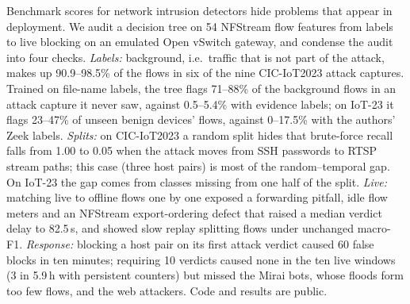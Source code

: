 Benchmark scores for network intrusion detectors hide problems that appear in deployment. We audit a decision tree on 54 NFStream flow features from labels to live blocking on an emulated Open vSwitch gateway, and condense the audit into four checks. \emph{Labels:} background, i.e.\ traffic that is not part of the attack, makes up 90.9--98.5\% of the flows in six of the nine CIC-IoT2023 attack captures. Trained on file-name labels, the tree flags 71--88\% of the background flows in an attack capture it never saw, against 0.5--5.4\% with evidence labels; on IoT-23 it flags 23--47\% of unseen benign devices' flows, against 0--17.5\% with the authors' Zeek labels. \emph{Splits:} on CIC-IoT2023 a random split hides that brute-force recall falls from 1.00 to 0.05 when the attack moves from SSH passwords to RTSP stream paths; this case (three host pairs) is most of the random--temporal gap. On IoT-23 the gap comes from classes missing from one half of the split. \emph{Live:} matching live to offline flows one by one exposed a forwarding pitfall, idle flow meters and an NFStream export-ordering defect that raised a median verdict delay to 82.5\,s, and showed slow replay splitting flows under unchanged macro-F1. \emph{Response:} blocking a host pair on its first attack verdict caused 60 false blocks in ten minutes; requiring 10 verdicts caused none in the ten live windows (3 in 5.9\,h with persistent counters) but missed the Mirai bots, whose floods form too few flows, and the web attackers. Code and results are public.
